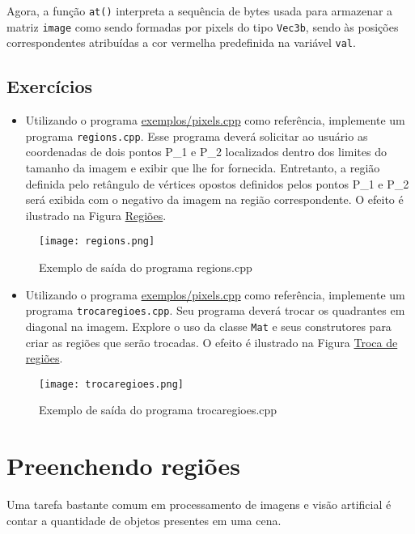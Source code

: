\documentclass[11pt]{amsbook}
\begin{document}
Agora, a função \texttt{at()} interpreta a sequência de bytes usada para
armazenar a matriz \texttt{image} como sendo formadas por pixels do tipo
\texttt{Vec3b}, sendo às posições correspondentes atribuídas a cor vermelha
predefinida na variável \texttt{val}.


\hypertarget{x-exercícios}{\section{Exercícios}}
\begin{itemize}

\item Utilizando o programa \href{exemplos/pixels.cpp}{exemplos/pixels.cpp} como referência,
implemente um programa \texttt{regions.cpp}. Esse programa deverá solicitar
ao usuário as coordenadas de dois pontos P_1 e P_2
localizados dentro dos limites do tamanho da imagem e exibir que lhe
for fornecida. Entretanto, a região definida pelo retângulo de
vértices opostos definidos pelos pontos P_1 e P_2 será
exibida com o negativo da imagem na região correspondente. O efeito
é ilustrado na Figura \hyperlink{fig-regions}{Regiões}.

\end{itemize}


\begin{figure}[h]{}
\centering\texttt{[image: regions.png]}
\caption{Exemplo de saída do programa regions.cpp}

\end{figure}

\begin{itemize}

\item Utilizando o programa \href{exemplos/pixels.cpp}{exemplos/pixels.cpp} como referência,
implemente um programa \texttt{trocaregioes.cpp}. Seu programa deverá
trocar os quadrantes em diagonal na imagem. Explore o uso da classe
\texttt{Mat} e seus construtores para criar as regiões que serão
trocadas. O efeito é ilustrado na Figura \hyperlink{fig-trocaregioes}{Troca de regiões}.

\end{itemize}


\begin{figure}[h]{}
\centering\texttt{[image: trocaregioes.png]}
\caption{Exemplo de saída do programa trocaregioes.cpp}

\end{figure}

\hypertarget{x-preenchendo-regiões}{\chapter{Preenchendo regiões}}
Uma tarefa bastante comum em processamento de imagens e visão
artificial é contar a quantidade de objetos presentes em uma cena.
\end{document}
